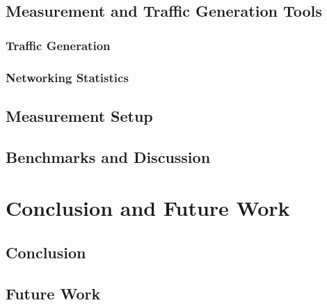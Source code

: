 \section{Measurement and Traffic Generation Tools}
\subsection{Traffic Generation}
\subsection{Networking Statistics}
\section{Measurement Setup}
\section{Benchmarks and Discussion}

\chapter{\label{chp:content} Conclusion and Future Work}
\section{Conclusion}
\section{Future Work}

